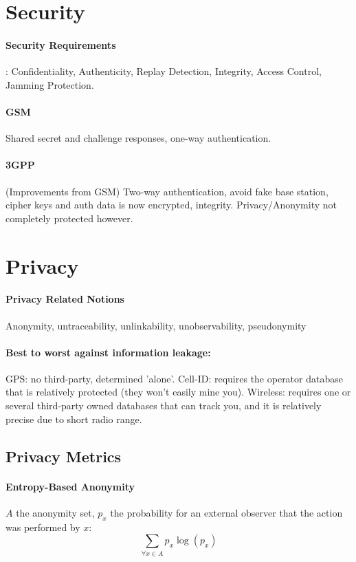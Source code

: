 \documentclass[6pt]{scrartcl}
\begin{document}
\begin{multicols}{4}
\section{Security}
\paragraph{Security Requirements}: Confidentiality, Authenticity, Replay Detection, Integrity, Access Control, Jamming Protection.
\paragraph{GSM} Shared secret and challenge responses, one-way authentication.
\paragraph{3GPP} (Improvements from GSM) Two-way authentication, avoid fake base station, cipher keys and auth data is now encrypted, integrity. Privacy/Anonymity not completely protected however.

\section{Privacy}
\paragraph{Privacy Related Notions}Anonymity, untraceability, unlinkability, unobservability, pseudonymity
\paragraph{Best to worst against information leakage:}
GPS: no third-party, determined 'alone'.
Cell-ID: requires the operator database that is relatively protected (they won't easily mine you).
Wireless: requires one or several third-party owned databases that can track you, and it is relatively precise due to short radio range.

\subsection{Privacy Metrics}

\paragraph{Entropy-Based Anonymity}
$A$ the anonymity set, $p_x$ the probability for an external observer that the action was performed by $x$:
\begin{equation*}
	\sum_{\forall x \in A} p_x \log(p_x)
\end{equation*}


\end{multicols}
\end{document}
